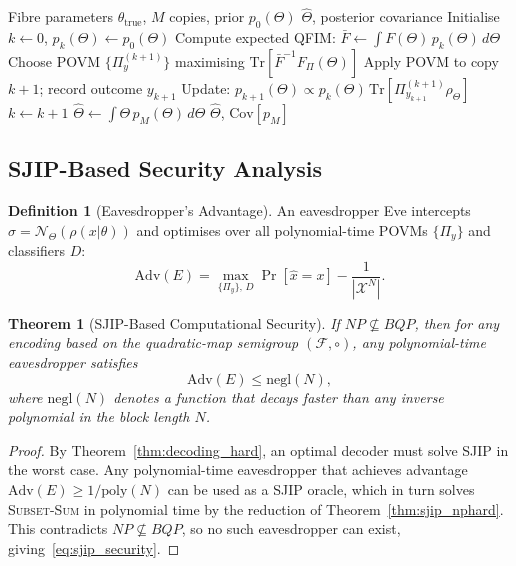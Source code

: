 \documentclass[journal,twocolumn]{IEEEtran}
\theoremstyle{definition}
\newtheorem{definition}{Definition}[section]
\theoremstyle{plain}
\newtheorem{theorem}{Theorem}[section]
\newcommand{\Tr}{\mathrm{Tr}}
\begin{document}
\begin{algorithm}[t]
\caption{Adaptive Bayesian Channel Parameter Estimation}
\label{alg:estimation}
\begin{algorithmic}[1]
\Require Fibre parameters $\theta_{\mathrm{true}}$,\; $M$ copies,\;
         prior $p_0(\Theta)$
\Ensure $\hat\Theta$, posterior covariance
\State Initialise $k \leftarrow 0$,\; $p_k(\Theta) \leftarrow p_0(\Theta)$
  \State Compute expected QFIM:
         $\bar F \leftarrow \int F(\Theta)\,p_k(\Theta)\,d\Theta$
  \State Choose POVM $\{\Pi_y^{(k+1)}\}$ maximising
         $\Tr[\bar F^{-1} F_\Pi(\Theta)]$
  \State Apply POVM to copy $k+1$; record outcome $y_{k+1}$
  \State Update: $p_{k+1}(\Theta) \propto
         p_k(\Theta)\,\Tr[\Pi_{y_{k+1}}^{(k+1)} \rho_\Theta]$
  \State $k \leftarrow k + 1$
\EndWhile
\State $\hat\Theta \leftarrow \int\Theta\,p_M(\Theta)\,d\Theta$
\Return $\hat\Theta$,\; $\mathrm{Cov}[p_M]$
\end{algorithmic}
\end{algorithm}

\subsection{SJIP-Based Security Analysis}

\begin{definition}[Eavesdropper's Advantage]
\label{def:adv}
An eavesdropper Eve intercepts $\sigma = \mathcal{N}_\Theta(\rho(x|\theta))$
and optimises over all polynomial-time POVMs $\{\Pi_y\}$ and
classifiers $D$:
\begin{equation}
  \mathrm{Adv}(E) = \max_{\{\Pi_y\},\,D}
  \Pr[\hat x = x] - \frac{1}{|\mathcal{X}^N|}.
  \label{eq:adv_def}
\end{equation}
\end{definition}

\begin{theorem}[SJIP-Based Computational Security]
\label{thm:sjip_security}
If $NP \not\subseteq BQP$, then for any encoding based on the
quadratic-map semigroup $(\mathcal{F}, \circ)$, any
polynomial-time eavesdropper satisfies
\begin{equation}
  \mathrm{Adv}(E) \le \mathrm{negl}(N),
  \label{eq:sjip_security}
\end{equation}
where $\mathrm{negl}(N)$ denotes a function that decays faster
than any inverse polynomial in the block length $N$.
\end{theorem}

\begin{proof}
By Theorem~\ref{thm:decoding_hard}, an optimal decoder must solve
SJIP in the worst case.  Any polynomial-time eavesdropper that
achieves advantage $\mathrm{Adv}(E) \ge 1/\mathrm{poly}(N)$ can
be used as a SJIP oracle, which in turn solves \textsc{Subset-Sum}
in polynomial time by the reduction of Theorem~\ref{thm:sjip_nphard}.
This contradicts $NP \not\subseteq BQP$, so no such eavesdropper can
exist, giving~\eqref{eq:sjip_security}.
\end{proof}
\end{document}
